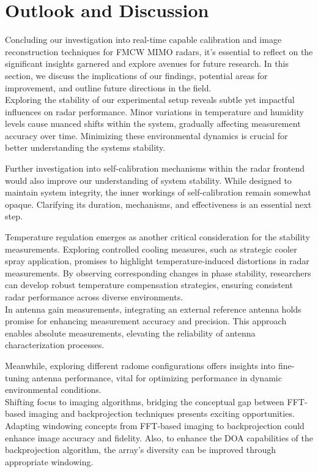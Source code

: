 \section{Outlook and Discussion}

Concluding our investigation into real-time capable calibration and image reconstruction techniques for FMCW MIMO radars,
it's essential to reflect on the significant insights garnered and explore avenues for future research.
In this section, we discuss the implications of our findings, potential areas for improvement,
and outline future directions in the field.
\\

Exploring the stability of our experimental setup reveals subtle yet impactful influences on radar performance.
Minor variations in temperature and humidity levels cause nuanced shifts within the system,
gradually affecting measurement accuracy over time.
Minimizing these environmental dynamics is crucial for better understanding the systems stability.

Further investigation into self-calibration mechanisms within the radar frontend would also improve our understanding of system stability.
While designed to maintain system integrity, the inner workings of self-calibration remain somewhat opaque.
Clarifying its duration, mechanisms, and effectiveness is an essential next step.

Temperature regulation emerges as another critical consideration for the stability measurements.
Exploring controlled cooling measures, such as strategic cooler spray application,
promises to highlight temperature-induced distortions in radar measurements.
By observing corresponding changes in phase stability,
researchers can develop robust temperature compensation strategies,
ensuring consistent radar performance across diverse environments.
\\
In antenna gain measurements, integrating an external reference antenna
holds promise for enhancing measurement accuracy and precision.
This approach enables absolute measurements, elevating the reliability of antenna characterization processes.

Meanwhile, exploring different radome configurations offers insights into fine-tuning antenna performance,
vital for optimizing performance in dynamic environmental conditions.
\\

Shifting focus to imaging algorithms, bridging the conceptual gap between FFT-based imaging and
backprojection techniques presents exciting opportunities.
Adapting windowing concepts from FFT-based imaging to backprojection could enhance image accuracy and fidelity.
Also, to enhance the DOA capabilities of the backprojection algorithm,
the array's diversity can be improved through appropriate windowing.

